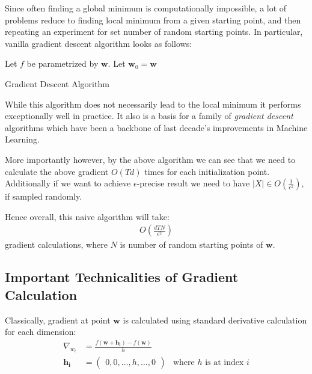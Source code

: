 \documentclass{article}
\begin{document}
Since often finding a global minimum is computationally impossible, a lot of problems reduce to finding local minimum from a given starting point,
and then repeating an experiment for set number of random starting points. In particular, vanilla gradient descent algorithm looks as follows:

\begin{algorithm}[H]
    \SetAlgoLined
    Let $f$ be parametrized by $\pmb{w}$. \;
    Let $\pmb{w}_0 = \pmb{w}$ \;
    \caption{Gradient Descent Algorithm}
    \label{alg:vanilla-grad-desc}
\end{algorithm}

While this algorithm does not necessarily lead to the local minimum it performs exceptionally well in practice. It also is a basis for a family of
\textit{gradient descent} algorithms which have been a backbone of last decade's improvements in Machine Learning.

More importantly however, by the above algorithm we can see that we need to calculate the above gradient $O(Td)$ times for each initialization point.
Additionally if we want to achieve $\epsilon$-precise result we need to have $|X| \in O(\frac{1}{\epsilon^2})$, if sampled randomly.

Hence overall, this naive algorithm will take:
\begin{align}
    O(\frac{dTN}{\epsilon^2})
\end{align}
gradient calculations, where $N$ is number of random starting points of $\pmb{w}$.

\subsection{Important Technicalities of Gradient Calculation}
\label{subsec:tech-grad}

Classically, gradient at point $\pmb{w}$ is calculated using standard derivative calculation for each dimension:
\begin{align}
    \label{eq:grad1}
    \nabla_{w_i} &= \frac{f(\pmb{w} + \pmb{h_i}) - f(\pmb{w})}{h} \\
    \pmb{h_i} &= \begin{pmatrix}
        0, 0, \hdots, h, \hdots, 0
    \end{pmatrix} & \text{where $h$ is at index $i$}
\end{align}
\end{document}
